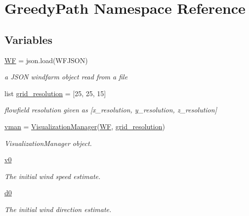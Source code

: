 \hypertarget{namespace_greedy_path}{}\section{Greedy\+Path Namespace Reference}
\label{namespace_greedy_path}
\subsection*{Variables}
\begin{DoxyCompactItemize}
\item 
\mbox{\hyperlink{namespace_greedy_path_a23138d42757308a7b4324002f60d751a}{WF}} = json.\+load(W\+F\+J\+S\+ON)
\begin{DoxyCompactList}\small\item\em a J\+S\+ON windfarm object read from a file \end{DoxyCompactList}\item 
list \mbox{\hyperlink{namespace_greedy_path_a1d2a41e131ea92ec827544055660645d}{grid\+\_\+resolution}} = \mbox{[}25, 25, 15\mbox{]}
\begin{DoxyCompactList}\small\item\em flowfield resolution given as \mbox{[}x\+\_\+resolution, y\+\_\+resolution, z\+\_\+resolution\mbox{]} \end{DoxyCompactList}\item 
\mbox{\hyperlink{namespace_greedy_path_a0b686e13d9e46e185e611dc0b5d92e8f}{vman}} = \mbox{\hyperlink{classvisualization__manager___d_j_1_1_visualization_manager}{Visualization\+Manager}}(\mbox{\hyperlink{namespace_greedy_path_a23138d42757308a7b4324002f60d751a}{WF}}, \mbox{\hyperlink{namespace_greedy_path_a1d2a41e131ea92ec827544055660645d}{grid\+\_\+resolution}})
\begin{DoxyCompactList}\small\item\em Visualization\+Manager object. \end{DoxyCompactList}\item 
\mbox{\hyperlink{namespace_greedy_path_ac3503601b08d4fc59e5cbc91d32492f0}{v0}}
\begin{DoxyCompactList}\small\item\em The initial wind speed estimate. \end{DoxyCompactList}\item 
\mbox{\hyperlink{namespace_greedy_path_a3dd8a5c17eb3ef664131b4d0070b61f8}{d0}}
\begin{DoxyCompactList}\small\item\em The initial wind direction estimate. \end{DoxyCompactList}\item 

\end{DoxyCompactItemize}

